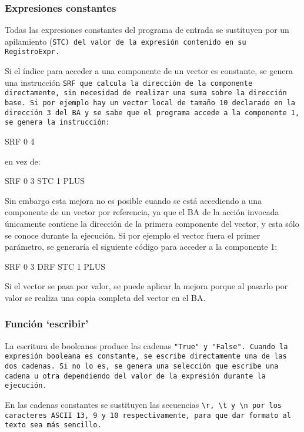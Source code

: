\subsubsection{Expresiones constantes}
Todas las expresiones constantes del programa de entrada se sustituyen por un apilamiento (\tt{STC}) del valor de la expresión contenido en su \tt{RegistroExpr}.

Si el índice para acceder a una componente de un vector es constante, se genera una instrucción \tt{SRF} que calcula la dirección de la componente directamente, sin necesidad de realizar una suma sobre la dirección base. Si por ejemplo hay un vector local de tamaño 10 declarado en la dirección 3 del BA y se sabe que el programa accede a la componente 1, se genera la instrucción:

\begin{codigo}
        SRF 0 4
\end{codigo}

en vez de:

\begin{codigo}
        SRF 0 3
        STC 1
        PLUS
\end{codigo}

Sin embargo esta mejora no es posible cuando se está accediendo a una componente de un vector por referencia, ya que el BA de la acción invocada únicamente contiene la dirección de la primera componente del vector, y esta sólo se conoce durante la ejecución. Si por ejemplo el vector fuera el primer parámetro, se generaría el siguiente código para acceder a la componente 1:

\begin{codigo}
        SRF 0 3
        DRF
        STC 1
        PLUS
\end{codigo}

Si el vector se pasa por valor, se puede aplicar la mejora porque al pasarlo por valor se realiza una copia completa del vector en el BA.

\subsubsection{Función `escribir'}
La escritura de booleanos produce las cadenas \tt{"True"} y \tt{"False"}. Cuando la expresión booleana es constante, se escribe directamente una de las dos cadenas. Si no lo es, se genera una selección que escribe una cadena u otra dependiendo del valor de la expresión durante la ejecución.

En las cadenas constantes se sustituyen las secuencias \tt{\textbackslash r}, \tt{\textbackslash t} y \tt{\textbackslash n} por los caracteres ASCII 13, 9 y 10 respectivamente, para que dar formato al texto sea más sencillo.
